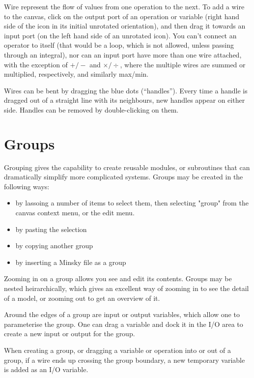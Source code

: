 Wire represent the flow of values from one operation to the next. To
add a wire to the canvas, click on the output port of an operation or
variable (right hand side of the icon in its initial unrotated
orientation), and then drag it towards an input port (on the left hand
side of an unrotated icon). You can't connect an operator to itself
(that would be a loop, which is not allowed, unless passing through an
integral), nor can an input port have more than one wire
attached, with the exception of $+/-$ and $\times/\div$, where the
multiple wires are summed or multiplied, respectively, and similarly max/min.

Wires can be bent by dragging the blue dots (``handles''). Every time
a handle is dragged out of a straight line with its neighbours, new
handles appear on either side. Handles can be removed by
double-clicking on them.

\section{Groups}\label{group}

Grouping gives the capability to create reusable modules, or subroutines that
can dramatically simplify more complicated systems. Groups may be
created in the following ways:
\begin{itemize}
\item by lassoing a number of items to select them, then selecting
"group" from the canvas context menu, or the edit menu.
\item by pasting the selection
\item by copying another group
\item by inserting a Minsky file as a group
\end{itemize}

Zooming in on a group allows you see and edit its contents. Groups may
be nested heirarchically, which gives an excellent way of zooming in
to see the detail of a model, or zooming out to get an overview of it.

Around the edges of a group are input or output variables, which allow
one to parameterise the group. One can drag a variable and dock it in
the I/O area to create a new input or output for the group.

When creating a group, or dragging a variable or operation into or out
of a group, if a wire ends up crossing the group boundary, a new
temporary variable is added as an I/O variable.


